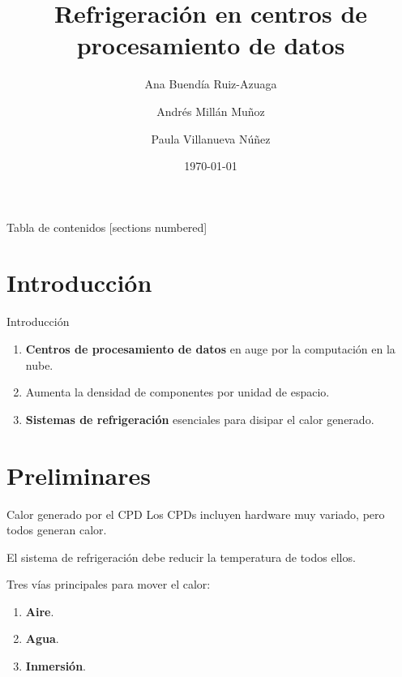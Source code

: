 \documentclass[aspectratio=169, compress]{beamer}
\title{Refrigeración en centros de procesamiento de datos}
\date{\today}
\author{Ana Buendía Ruiz-Azuaga \and Andrés Millán Muñoz \and Paula Villanueva Núñez}
\institute{Universidad de Granada}
\begin{document}
\maketitle

\begin{frame}{Tabla de contenidos}
    [sections numbered]
    \tableofcontents
\end{frame}

\section{Introducción}    %

\begin{frame}{Introducción}
    \begin{enumerate}
        \item \textbf{Centros de procesamiento de datos} en auge por la computación en la nube.
        \item Aumenta la densidad de componentes por unidad de espacio.
        \item \textbf{Sistemas de refrigeración} esenciales para disipar el calor generado. 
    \end{enumerate}    
\end{frame}


\section{Preliminares}

\begin{frame}{Calor generado por el CPD}
    Los CPDs incluyen hardware muy variado, pero todos generan calor. 
        
    El sistema de refrigeración debe reducir la temperatura de todos ellos. 

    Tres vías principales para mover el calor:

    \begin{enumerate}
        \item \textbf{Aire}.
        \item \textbf{Agua}.
        \item \textbf{Inmersión}.
    \end{enumerate}
\end{frame}
\end{document}
